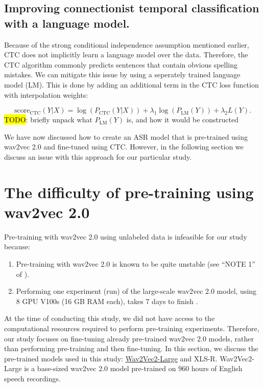 \subsection{Improving connectionist temporal classification with a language model.} \label{subsec:lm-boost}
Because of the strong conditional independence assumption mentioned earlier,
CTC does not implicitly learn a language model over the data.
Therefore, the CTC algorithm commonly predicts sentences that contain obvious spelling mistakes.
We can mitigate this issue by using a seperately trained language model (LM).
This is done by adding an additional term in the CTC loss function with interpolation weights:

\begin{equation}
    \text{score}_{\text{CTC}}(Y|X) = \log\left(P_{\text{CTC}}(Y|X)\right) + \lambda_1 \log\left(P_{\text{LM}}(Y)\right) + \lambda_2 L(Y).
\end{equation}
\hl{TODO}: briefly unpack what $P_{\text{LM}}(Y)$ is, and how it would be constructed

We have now discussed how to create an ASR model that is pre-trained using wav2vec 2.0 and fine-tuned using CTC. 
However, in the following section we discuss an issue with this approach for our particular study.



\section{The difficulty of pre-training using wav2vec 2.0}
Pre-training with wav2vec 2.0 using unlabeled data is infeasible for our study because:
\begin{enumerate}
    \item Pre-training with wav2vec 2.0 is known to be quite unstable (see ``NOTE 1'' of \cite{vonplaten2021pretraining}).
    \item Performing one experiment (run) of the large-scale wav2vec 2.0 model, using 8 GPU V100s (16 GB RAM each), takes 7 days to finish \cite{vonplaten2021pretraining}.
\end{enumerate}
At the time of conducting this study, we did not have access to the computational resources required to perform pre-training experiments.
Therefore, our study focuses on fine-tuning already pre-trained wav2vec 2.0 models, rather than performing pre-training and then fine-tuning.
In this section, we discuss the pre-trained models used in this study: \href{https://huggingface.co/facebook/wav2vec2-large}{Wav2Vec2-Large} and XLS-R.
Wav2Vec2-Large \cite{baevski2020wav2vec} is a base-sized wav2vec 2.0 model pre-trained on $960$ hours of English speech recordings.

